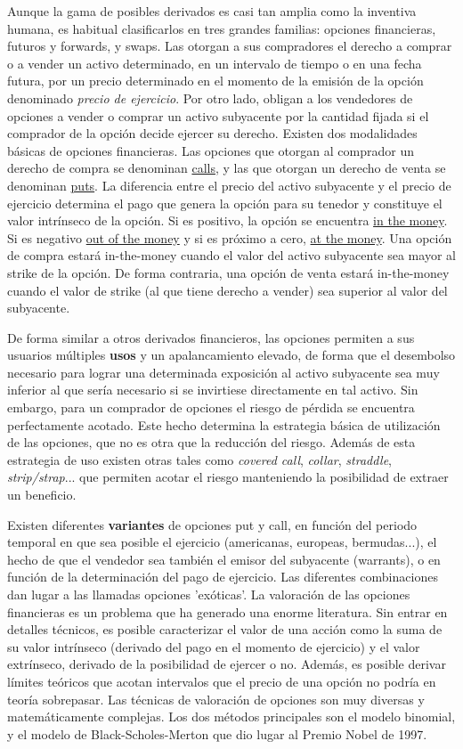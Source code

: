 \documentclass{nuevotema}
\begin{document}
Aunque la gama de posibles derivados es casi tan amplia como la inventiva humana, es habitual clasificarlos en tres grandes familias: opciones financieras, futuros y forwards, y swaps. Las  otorgan a sus compradores el derecho a comprar o a vender un activo determinado, en un intervalo de tiempo o en una fecha futura, por un precio determinado en el momento de la emisión de la opción denominado \textit{precio de ejercicio}. Por otro lado, obligan a los vendedores de opciones a vender o comprar un activo subyacente por la cantidad fijada si el comprador de la opción decide ejercer su derecho. Existen dos modalidades básicas de opciones financieras. Las opciones que otorgan al comprador un derecho de compra se denominan \underline{calls}, y las que otorgan un derecho de venta se denominan \underline{puts}. La diferencia entre el precio del activo subyacente y el precio de ejercicio determina el pago que genera la opción para su tenedor y constituye el valor intrínseco de la opción. Si es positivo, la opción se encuentra \underline{in the money}. Si es negativo \underline{out of the money} y si es próximo a cero, \underline{at the money}. Una opción de compra estará in-the-money cuando el valor del activo subyacente sea mayor al strike de la opción. De forma contraria, una opción de venta estará in-the-money cuando el valor de strike (al que tiene derecho a vender) sea superior al valor del subyacente.

De forma similar a otros derivados financieros, las opciones permiten a sus usuarios múltiples \textbf{usos} y un apalancamiento elevado, de forma que el desembolso necesario para lograr una determinada exposición al activo subyacente sea muy inferior al que sería necesario si se invirtiese directamente en tal activo. Sin embargo, para un comprador de opciones el riesgo de pérdida se encuentra perfectamente acotado. Este hecho determina la estrategia básica de utilización de las opciones, que no es otra que la reducción del riesgo. Además de esta estrategia de uso existen otras tales como \textit{covered call}, \textit{collar}, \textit{straddle}, \textit{strip/strap}... que permiten acotar el riesgo manteniendo la posibilidad de extraer un beneficio. 

Existen diferentes \textbf{variantes} de opciones put y call, en función del periodo temporal en que sea posible el ejercicio (americanas, europeas, bermudas...), el hecho de que el vendedor sea también el emisor del subyacente (warrants), o en función de la determinación del pago de ejercicio. Las diferentes combinaciones dan lugar a las llamadas opciones 'exóticas'. La valoración de las opciones financieras es un problema que ha generado una enorme literatura. Sin entrar en detalles técnicos, es posible caracterizar el valor de una acción como la suma de su valor intrínseco (derivado del pago en el momento de ejercicio) y el valor extrínseco, derivado de la posibilidad de ejercer o no. Además, es posible derivar límites teóricos que acotan intervalos que el precio de una opción no podría en teoría sobrepasar. Las técnicas de valoración de opciones son muy diversas y matemáticamente complejas. Los dos métodos principales son el modelo binomial, y el modelo de Black-Scholes-Merton que dio lugar al Premio Nobel de 1997. 
\end{document}
